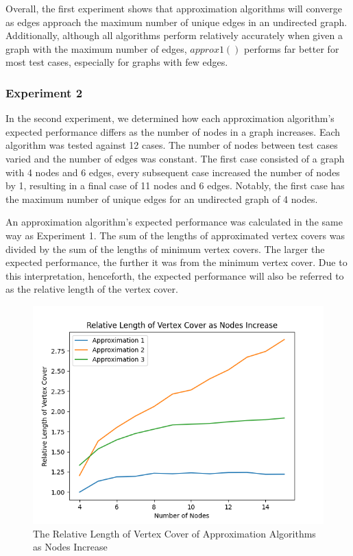 \documentclass[titlepage]{article}
\begin{document}
Overall, the first experiment shows that approximation algorithms will converge as edges approach the maximum number of unique edges in an undirected graph. Additionally, although all algorithms perform relatively accurately when given a graph with the maximum number of edges, $approx1()$ performs far better for most test cases, especially for graphs with few edges.

\subsubsection{Experiment 2}

In the second experiment, we determined how each approximation algorithm's expected performance differs as the number of nodes in a graph increases. Each algorithm was tested against 12 cases. The number of nodes between test cases varied and the number of edges was constant. The first case consisted of a graph with 4 nodes and 6 edges, every subsequent case increased the number of nodes by 1, resulting in a final case of 11 nodes and 6 edges. Notably, the first case has the maximum number of unique edges for an undirected graph of 4 nodes.

An approximation algorithm's expected performance was calculated in the same way as Experiment 1. The sum of the lengths of approximated vertex covers was divided by the sum of the lengths of minimum vertex covers. The larger the expected performance, the further it was from the minimum vertex cover. Due to this interpretation, henceforth, the expected performance will also be referred to as the relative length of the vertex cover.

\begin{figure}[H]
    \centering
    \includegraphics[width=0.8\linewidth]{experiment_3_2.png}
    \caption{The Relative Length of Vertex Cover of Approximation Algorithms as Nodes Increase}
    \label{fig:experiment_3_2}
\end{figure}
\end{document}
